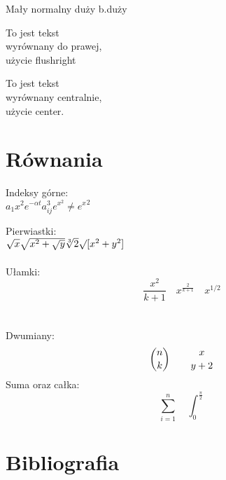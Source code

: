 \documentclass[a4paper]{article}
\begin{document}
{\tiny Mały \normalsize normalny \LARGE	duży \huge	b.duży }

\begin{flushright}

To jest tekst\\
wyrównany do prawej,\\
użycie flushright\\
\end{flushright}

\begin{center}

To jest tekst\\
wyrównany centralnie,\\
użycie center.\\
\end{center}


\section{Równania}

Indeksy górne:\\
$a_{1} x^{2} e^{-\alpha t}
a^{3}_{ij} e^{x^2} \neq {e^x}^2$

Pierwiastki:\\
$\sqrt{x} \sqrt{ x^{2}+\sqrt{y}}
\sqrt[3]{2} \surd[x^2 + y^2]$
\\\\
Ułamki:
$$
\frac{ x^{2} }{ k+1 }\quad
x^{ \frac{2}{k+1} }\quad x^{ 1/2 }
$$
\\\\
Dwumiany:
$$
{n \choose k}\qquad {x \atop y+2}
$$
Suma oraz całka:
$$
\sum_{i=1}^{n} \quad
\int_{0}^{\frac{\pi}{2}}
$$
\section{Bibliografia}


\end{document}

